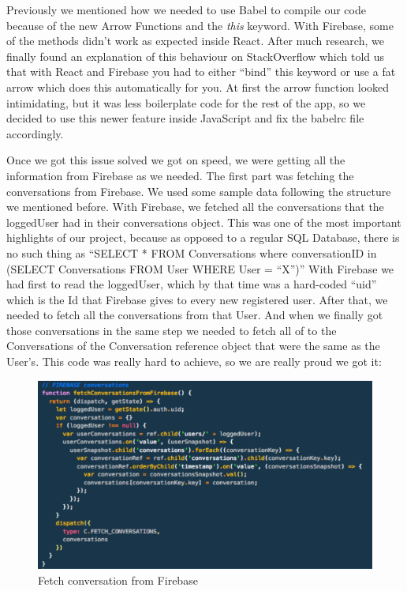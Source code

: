 Previously we mentioned how we needed to use Babel to compile our code because of the new Arrow Functions and the \textit{this} keyword. With Firebase, some of the methods didn't work as expected inside React. After much research, we finally found an explanation of this behaviour on StackOverflow which told us that with React and Firebase you had to either “bind” this keyword or use a fat arrow which does this automatically for you. At first the arrow function looked intimidating, but it was less boilerplate code for the rest of the app, so we decided to use this newer feature inside JavaScript and fix the babelrc file accordingly. 

Once we got this issue solved we got on speed, we were getting all the information from Firebase as we needed. The first part was fetching the conversations from Firebase. We used some sample data following the structure we mentioned before. With Firebase, we fetched all the conversations that the loggedUser had in their conversations object. This was one of the most important highlights of our project, because as opposed to a regular SQL Database, there is no such thing as “SELECT * FROM Conversations where conversationID in (SELECT Conversations FROM User WHERE User = “X”)” With Firebase we had first to read the loggedUser, which by that time was a hard-coded “uid” which is the Id that Firebase gives to every new registered user. After that, we needed to fetch all the conversations from that User. And when we finally got those conversations in the same step we needed to fetch all of to the Conversations of the Conversation reference object that were the same as the User’s. This code was really hard to achieve, so we are really proud we got it:


\begin{figure}[ht]
\centering
\includegraphics[width=1\textwidth]{figs/Fetch-conversation}
	\caption{Fetch conversation from Firebase}
	\label{fig:Fetch-conversation}
\end{figure}

